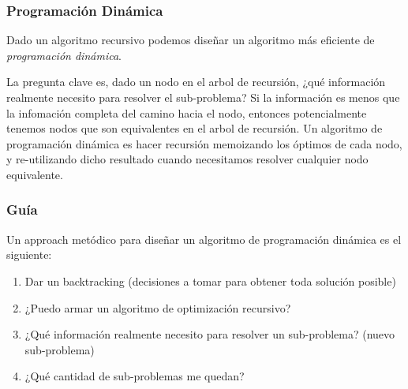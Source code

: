 \subsubsection*{Programación Dinámica}

Dado un algoritmo recursivo podemos diseñar un algoritmo más eficiente de \textit{programación dinámica}.

La pregunta clave es, dado un nodo en el arbol de recursión, ¿qué información realmente necesito para resolver el sub-problema? Si la información es menos que la infomación completa del camino hacia el nodo, entonces potencialmente tenemos nodos que son equivalentes en el arbol de recursión. Un algoritmo de programación dinámica es hacer recursión memoizando los óptimos de cada nodo, y re-utilizando dicho resultado cuando necesitamos resolver cualquier nodo equivalente.

\subsubsection*{Guía}

Un approach metódico para diseñar un algoritmo de programación dinámica es el siguiente:

\begin{enumerate}
    \item Dar un backtracking (decisiones a tomar para obtener toda solución posible)
    \item ¿Puedo armar un algoritmo de optimización recursivo?
    \item ¿Qué información realmente necesito para resolver un sub-problema? (nuevo sub-problema)
    \item ¿Qué cantidad de sub-problemas me quedan?
\end{enumerate}


